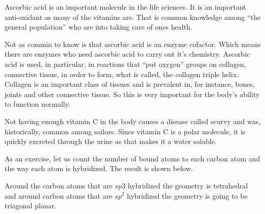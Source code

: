 \documentclass[../mit-general-chemistry.tex]{subfiles}
\begin{document}
Ascorbic acid is an important molecule in the life sciences. It is an
important anti-oxidant as many of the vitamins are. That is common
knowledge among ``the general population'' who are into taking care of
ones health.

Not as commin to know is that ascorbic acid is an enzyme
cofactor. Which means there are enzymes who need ascorbic acid to
carry out it's chemistry. Ascorbic acid is used, in particular, in
reactions that ``put oxygen''  groups on collagen, connective
tissue, in order to form, what is called, the collagen triple
helix. Collagen is an important class of tissues and is prevalent in,
for instance, bones, joints and other connective tissue. So this is
very important for the body's ability to function normally.

Not having enough vitamin C in the body causes a disease called
scurvy and was, historically, common among sailors. Since vitamin C is
a polar molecule, it is quickly excreted through the urine as that
makes it a water soluble.


As an exercise, let us count the number of bound atoms to each carbon
atom and the way each atom is hybridized. The result is shown below.

\vspace{\parskip}
\begin{center}
\end{center}

Around the carbon atoms that are $sp3$ hybridized the geometry is
tetrahedral and around carbon atoms that are $sp^2$ hybridized the
geometry is going to be triagonal planar.
\end{document}
